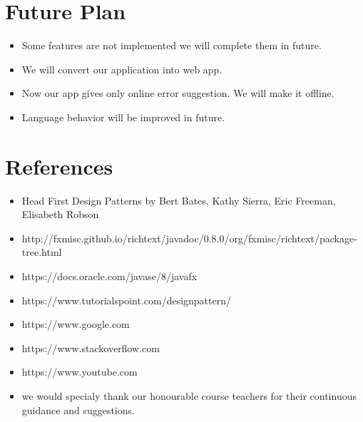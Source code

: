 \documentclass[a4paper]{article}
\begin{document}
\section{Future Plan}
\begin{itemize}
\item Some features are not implemented we will complete them in future.
\item We will convert our application into web app.
\item Now our app gives only online error suggestion. We will make it offline.
\item Language behavior will be improved in future.
\end{itemize}
\section*{References}
\begin{itemize}
\item Head First Design Patterns by  Bert Bates, Kathy Sierra, Eric Freeman, Elisabeth Robson
\item http://fxmisc.github.io/richtext/javadoc/0.8.0/org/fxmisc/richtext/package-tree.html
\item https://docs.oracle.com/javase/8/javafx
\item https://www.tutorialspoint.com/designpattern/
\item https://www.google.com
\item https://www.stackoverflow.com
\item https://www.youtube.com
\item we would specialy thank our honourable course teachers for their continuous guidance and suggestions. 

\end{itemize}
\end{document}
